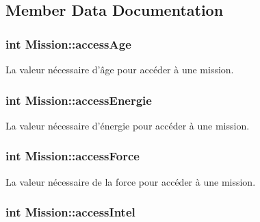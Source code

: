 \subsection{Member Data Documentation}
\hypertarget{class_mission_a78226357c57649c261115d34598f9a8e}{
\subsubsection[{access\-Age}]{\setlength{\rightskip}{0pt plus 5cm}int Mission\-::access\-Age\hspace{0.3cm}{\ttfamily [protected]}}}\label{class_mission_a78226357c57649c261115d34598f9a8e}


La valeur nécessaire d'âge pour accéder à une mission. 

\hypertarget{class_mission_ae767714f7433f66f519468bc1913a5ef}{
\subsubsection[{access\-Energie}]{\setlength{\rightskip}{0pt plus 5cm}int Mission\-::access\-Energie\hspace{0.3cm}{\ttfamily [protected]}}}\label{class_mission_ae767714f7433f66f519468bc1913a5ef}


La valeur nécessaire d'énergie pour accéder à une mission. 

\hypertarget{class_mission_a58a62ea21f7c074d87e8592a009dec49}{
\subsubsection[{access\-Force}]{\setlength{\rightskip}{0pt plus 5cm}int Mission\-::access\-Force\hspace{0.3cm}{\ttfamily [protected]}}}\label{class_mission_a58a62ea21f7c074d87e8592a009dec49}


La valeur nécessaire de la force pour accéder à une mission. 

\hypertarget{class_mission_af93302ac38548302411994e4cbf9b850}{
\subsubsection[{access\-Intel}]{\setlength{\rightskip}{0pt plus 5cm}int Mission\-::access\-Intel\hspace{0.3cm}{\ttfamily [protected]}}}\label{class_mission_af93302ac38548302411994e4cbf9b850}


